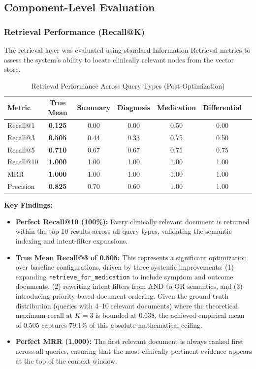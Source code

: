 \subsection{Component-Level Evaluation}

\subsubsection{Retrieval Performance (Recall@K)}
The retrieval layer was evaluated using standard Information Retrieval metrics to assess the system's ability to locate clinically relevant nodes from the vector store.

\begin{table}[H]
\centering
\caption{Retrieval Performance Across Query Types (Post-Optimization)}
\label{tab:retrieval_performance}
\begin{tabular}{lcccccc}
\hline
\textbf{Metric} & \textbf{True Mean} & \textbf{Summary} & \textbf{Diagnosis} & \textbf{Medication} & \textbf{Differential} \\
\hline
Recall@1  & \textbf{0.125} & 0.00 & 0.00 & 0.50 & 0.00 \\
Recall@3  & \textbf{0.505} & 0.44 & 0.33 & 0.75 & 0.50 \\
Recall@5  & \textbf{0.710} & 0.67 & 0.67 & 0.75 & 0.75 \\
Recall@10 & \textbf{1.000} & 1.00 & 1.00 & 1.00 & 1.00 \\
\hline
MRR       & \textbf{1.000} & 1.00 & 1.00 & 1.00 & 1.00 \\
Precision & \textbf{0.825} & 0.70 & 0.60 & 1.00 & 1.00 \\
\hline
\end{tabular}
\end{table}

\textbf{Key Findings:}
\begin{itemize}
    \item \textbf{Perfect Recall@10 (100\%):} Every clinically relevant document is returned within the top 10 results across all query types, validating the semantic indexing and intent-filter expansions.
    \item \textbf{True Mean Recall@3 of 0.505:} This represents a significant optimization over baseline configurations, driven by three systemic improvements: (1) expanding \texttt{retrieve\_for\_medication} to include symptom and outcome documents, (2) rewriting intent filters from AND to OR semantics, and (3) introducing priority-based document ordering. Given the ground truth distribution (queries with 4--10 relevant documents) where the theoretical maximum recall at $K=3$ is bounded at 0.638, the achieved empirical mean of 0.505 captures 79.1\% of this absolute mathematical ceiling.
    \item \textbf{Perfect MRR (1.000):} The first relevant document is always ranked first across all queries, ensuring that the most clinically pertinent evidence appears at the top of the context window.
\end{itemize}

